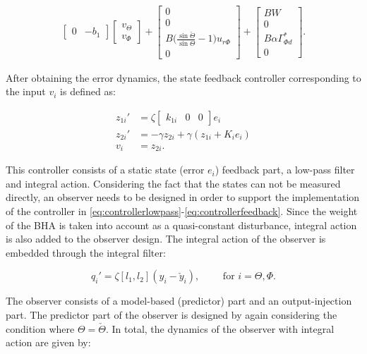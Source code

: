 \documentclass[main.tex]{subfiles}
\begin{document}
\begin{align}
\begin{bmatrix}
	 0 & -b_1 
	 \end{bmatrix}
	 \begin{bmatrix}
	 v_\Theta \\
	 v_\Phi
	 \end{bmatrix} + 
	 \begin{bmatrix}
	 0 \\
	 0 \\
	 B\bigg( \frac{\sin \check{\Theta}}{\sin \Theta} - 1 \bigg) u_{r\Phi} \\
	 0
	 \end{bmatrix}
	 \label{eq:errordynamics2}+
	 \begin{bmatrix}
	 BW \\
	 0 \\
	 B\alpha \Gamma_{\Phi d}^* \\
	 0
	 \end{bmatrix}.
	 \end{align}
	
	After obtaining the error dynamics, the state feedback controller corresponding to the input $v_i$ is defined as:
	
	\begin{align}
		z_{1i}' &= \zeta \begin{bmatrix}
		k_{1i} & 0 & 0
		\end{bmatrix}e_i \label{eq:controllerlowpass}\\
		z_{2i}' &= -\gamma z_{2i} + \gamma (z_{1i} + K_i e_i) \label{eq:controllerintegral}\\
		v_i &= z_{2i}\label{eq:controllerfeedback}.
	\end{align}
	
	This controller consists of a static state (error $e_i$) feedback part, a low-pass filter and integral action. Considering the fact that the states can not be measured directly, an observer needs to be designed in order to support the implementation of the controller in \eqref{eq:controllerlowpass}-\eqref{eq:controllerfeedback}. Since the weight of the BHA is taken into account as a quasi-constant disturbance, integral action is also added to the observer design. The integral action of the observer is embedded through the integral filter:
	
	\begin{equation}
		q_i' = \zeta[l_1,l_2](y_i - \check{y}_i), \qquad \text{ for } i=\Theta,\Phi.
	\end{equation}
	
	The observer consists of a model-based (predictor) part and an output-injection part. The predictor part of the observer is designed by again considering the condition where $\Theta = \check{\Theta}$. In total, the dynamics of the observer with integral action are given by:
\end{document}
